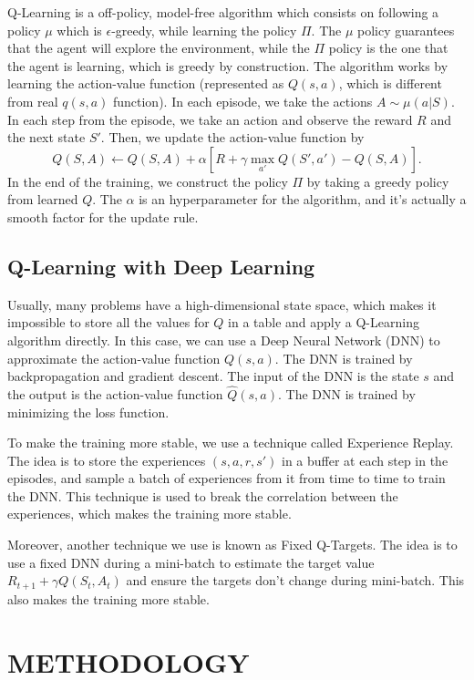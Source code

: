 \documentclass[conference]{IEEEtran}
\begin{document}
Q-Learning is a off-policy, model-free algorithm which consists on following a policy $\mu$ which is $\epsilon$-greedy, while learning the policy $\Pi$. The $\mu$ policy guarantees that the agent will explore the environment, while the $\Pi$ policy is the one that the agent is learning, which is greedy by construction. The algorithm works by learning the action-value function (represented as $Q(s, a)$, which is different from real $q(s,a)$ function). In each episode, we take the actions $A \sim \mu(a|S)$. In each step from the episode, we take an action and observe the reward $R$ and the next state $S'$. Then, we update the action-value function by
$$
   Q(S, A) \leftarrow Q(S, A) + \alpha \left[ R + \gamma \max_{a'} Q(S', a') - Q(S, A) \right].
$$
In the end of the training, we construct the policy $\Pi$ by taking a greedy policy from learned $Q$. The $\alpha$ is an hyperparameter for the algorithm, and it's actually a smooth factor for the update rule.

\subsection{Q-Learning with Deep Learning}

Usually, many problems have a high-dimensional state space, which makes it impossible to store all the values for $Q$ in a table and apply a Q-Learning algorithm directly. In this case, we can use a Deep Neural Network (DNN) to approximate the action-value function $Q(s, a)$. The DNN is trained by backpropagation and gradient descent. The input of the DNN is the state $s$ and the output is the action-value function $\hat Q(s, a)$. The DNN is trained by minimizing the loss function.

To make the training more stable, we use a technique called Experience Replay. The idea is to store the experiences $(s, a, r, s')$ in a buffer at each step in the episodes, and sample a batch of experiences from it from time to time to train the DNN. This technique is used to break the correlation between the experiences, which makes the training more stable.

Moreover, another technique we use is known as Fixed Q-Targets. The idea is to use a fixed DNN during a mini-batch to estimate the target value $R_{t+1} + \gamma Q(S_t, A_t)$ and ensure the targets don't change during mini-batch. This also makes the training more stable.

\section{METHODOLOGY}
\end{document}
